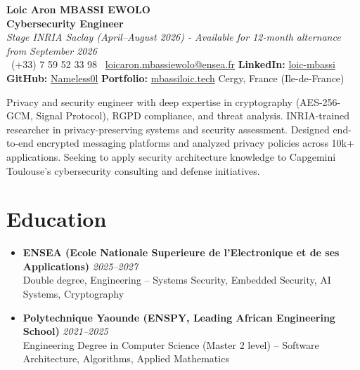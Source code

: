 \documentclass[a4paper,11pt]{article}
\begin{document}
\begin{center}
    {\Large \textbf{Loic Aron MBASSI EWOLO}} \\ \vspace{4pt}
    \textbf{\large Cybersecurity Engineer} \\
    \textit{\small Stage INRIA Saclay (April--August 2026) - Available for 12-month alternance from September 2026} \\ \vspace{4pt}
    \small
    \Mobilefone\ (+33) 7 59 52 33 98 \quad
    \Letter\ \href{mailto:loicaron.mbassiewolo@ensea.fr}{loicaron.mbassiewolo@ensea.fr} \quad
    \textbf{LinkedIn:} \href{https://www.linkedin.com/in/loic-mbassi/}{loic-mbassi} \\ \vspace{2pt}
    \textbf{GitHub:} \href{https://github.com/Nameless0l}{Nameless0l} \quad
    \textbf{Portfolio:} \href{https://mbassiloic.tech}{mbassiloic.tech} \quad
    Cergy, France (Ile-de-France)
\end{center}

\vspace{-6pt}

\noindent\small{Privacy and security engineer with deep expertise in cryptography (AES-256-GCM, Signal Protocol), RGPD compliance, and threat analysis. INRIA-trained researcher in privacy-preserving systems and security assessment. Designed end-to-end encrypted messaging platforms and analyzed privacy policies across 10k+ applications. Seeking to apply security architecture knowledge to Capgemini Toulouse's cybersecurity consulting and defense initiatives.}

\vspace{6pt}

\section{Education}
\begin{itemize}[leftmargin=*, label=\tiny$\bullet$, nosep]
    \item \textbf{ENSEA (Ecole Nationale Superieure de l'Electronique et de ses Applications)} \hfill \textit{2025--2027} \\
    \small{Double degree, Engineering -- Systems Security, Embedded Security, AI Systems, Cryptography}
    \item \textbf{Polytechnique Yaounde (ENSPY, Leading African Engineering School)} \hfill \textit{2021--2025} \\
    \small{Engineering Degree in Computer Science (Master 2 level) -- Software Architecture, Algorithms, Applied Mathematics}
\end{itemize}
\end{document}
